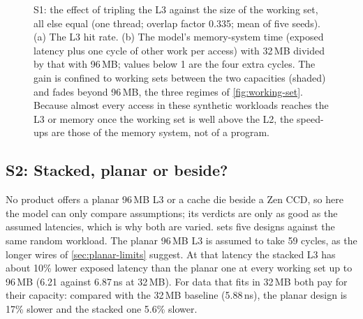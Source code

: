 \begin{figure}[htbp]
\begin{tikzpicture}
\end{tikzpicture}
\caption[S1: the effect of tripling the L3 against working-set size]{S1: the effect of tripling the L3 against the size of the working set, all else equal (one thread; overlap factor 0.335; mean of five seeds). (a) The L3 hit rate. (b) The model's memory-system time (exposed latency plus one cycle of other work per access) with 32\,MB divided by that with 96\,MB; values below 1 are the four extra cycles. The gain is confined to working sets between the two capacities (shaded) and fades beyond 96\,MB, the three regimes of \cref{fig:working-set}. Because almost every access in these synthetic workloads reaches the L3 or memory once the working set is well above the L2, the speed-ups are those of the memory system, not of a program.}
\label{fig:sim-working-set}
\end{figure}

\subsection{S2: Stacked, planar or beside?}
\label{sec:sim-designs}
No product offers a planar 96\,MB L3 or a cache die beside a Zen CCD, so here the model can only compare assumptions; its verdicts are only as good as the assumed latencies, which is why both are varied.  sets five designs against the same random workload. The planar 96\,MB L3 is assumed to take 59 cycles, as the longer wires of \cref{sec:planar-limits} suggest. At that latency the stacked L3 has about 10\% lower exposed latency than the planar one at every working set up to 96\,MB (6.21 against 6.87\,ns at 32\,MB). For data that fits in 32\,MB both pay for their capacity: compared with the 32\,MB baseline (5.88\,ns), the planar design is 17\% slower and the stacked one 5.6\% slower.

